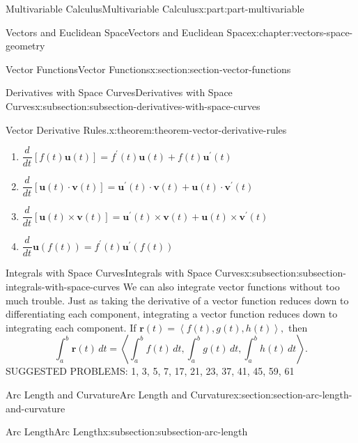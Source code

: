 \documentclass[twoside,10pt,]{book}
\numberwithin{equation}{part}
\newcommand{\dv}[3][]{\dfrac{d^{#1} #2}{d #3^{#1}}}
\newcommand{\dotprod}[1]{\left\langle #1 \right\rangle}
\begin{document}
\begin{partptx}{Multivariable Calculus}{}{Multivariable Calculus}{}{}{x:part:part-multivariable}
\begin{chapterptx}{Vectors and Euclidean Space}{}{Vectors and Euclidean Space}{}{}{x:chapter:vectors-space-geometry}
\begin{sectionptx}{Vector Functions}{}{Vector Functions}{}{}{x:section:section-vector-functions}
\begin{subsectionptx}{Derivatives with Space Curves}{}{Derivatives with Space Curves}{}{}{x:subsection:subsection-derivatives-with-space-curves}
\begin{theorem}{Vector Derivative Rules.}{}{x:theorem:theorem-vector-derivative-rules}
\begin{enumerate}
\item{}\(\displaystyle \dv{}{t}[f(t)\mathbf{u}(t)] = f^{\prime}(t)\mathbf{u}(t)+f(t)\mathbf{u}^{\prime}(t)\)%
\item{}\(\displaystyle \dv{}{t}[\mathbf{u}(t)\cdot\mathbf{v}(t)] = \mathbf{u}^{\prime}(t)\cdot\mathbf{v}(t)+\mathbf{u}(t)\cdot\mathbf{v}^{\prime}(t)\)%
\item{}\(\displaystyle \dv{}{t}[\mathbf{u}(t)\times\mathbf{v}(t)] = \mathbf{u}^{\prime}(t)\times\mathbf{v}(t)+\mathbf{u}(t)\times\mathbf{v}^{\prime}(t)\)%
\item{}\(\displaystyle \dv{}{t}\mathbf{u}(f(t)) = f^{\prime}(t)\mathbf{u}^{\prime}(f(t))\)%
\end{enumerate}
\end{theorem}
\end{subsectionptx}
%
%
\typeout{************************************************}
\typeout{************************************************}
%
\begin{subsectionptx}{Integrals with Space Curves}{}{Integrals with Space Curves}{}{}{x:subsection:subsection-integrals-with-space-curves}
We can also integrate vector functions without too much trouble. Just as taking the derivative of a vector function reduces down to differentiating each component, integrating a vector function reduces down to integrating each component. If \(\mathbf{r}(t) = \dotprod{f(t),g(t),h(t)},\) then%
%
\begin{equation}
\int_{a}^{b}\mathbf{r}(t)\,dt = \dotprod{\int_{a}^{b}f(t)\,dt,\int_{a}^{b}g(t)\,dt,\int_{a}^{b}h(t)\,dt}.\label{x:men:equation-vector-function-integration}
\end{equation}
SUGGESTED PROBLEMS: 1, 3, 5, 7, 17, 21, 23, 37, 41, 45, 59, 61%
\end{subsectionptx}
\end{sectionptx}
%
%
\typeout{************************************************}
\typeout{************************************************}
%
\begin{sectionptx}{Arc Length and Curvature}{}{Arc Length and Curvature}{}{}{x:section:section-arc-length-and-curvature}
%
%
\typeout{************************************************}
\typeout{************************************************}
%
\begin{subsectionptx}{Arc Length}{}{Arc Length}{}{}{x:subsection:subsection-arc-length}

\end{subsectionptx}
\end{sectionptx}
\end{chapterptx}
\end{partptx}
\end{document}
